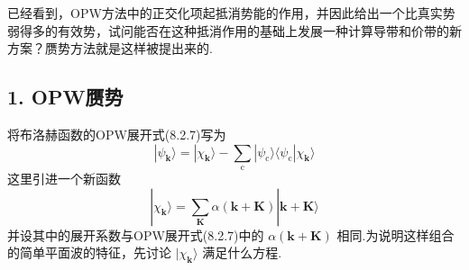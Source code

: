 已经看到，OPW方法中的正交化项起抵消势能的作用，并因此给出一个比真实势弱得多的有效势，试问能否在这种抵消作用的基础上发展一种计算导带和价带的新方案？赝势方法就是这样被提出来的.

\subsection*{1. OPW赝势}

将布洛赫函数的OPW展开式(8.2.7)写为
\begin{equation}
  |\psi_{\boldsymbol{k}}\rangle=|\chi_{\boldsymbol{k}}\rangle-\sum_{\mathrm{c}}|\psi_{\mathrm{c}}\rangle\langle\psi_{\mathrm{c}}|\chi_{\boldsymbol{k}}\rangle
\end{equation}
这里引进一个新函数
\begin{equation}
  |\chi_{\boldsymbol{k}}\rangle=\sum_{\boldsymbol{K}}\alpha(\boldsymbol{k}+\boldsymbol{K})|\boldsymbol{k}+\boldsymbol{K}\rangle
\end{equation}
并设其中的展开系数与OPW展开式(8.2.7)中的 $\alpha(\boldsymbol{k}+\boldsymbol{K})$ 相同.为说明这样组合的简单平面波的特征，先讨论 $|\chi_{\boldsymbol{k}}\rangle$ 满足什么方程.

